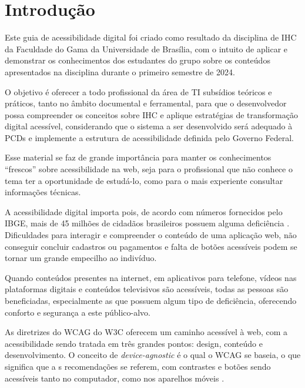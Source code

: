 \documentclass[
  12pt,
  openright,
  twoside,
  a4paper,
  english,
  french,
  spanish,
  brazil
]{abntex2}
\begin{document}
\tableofcontents*
\cleardoublepage

\textual

\chapter{Introdução}

Este guia de acessibilidade digital foi criado como resultado da disciplina de
IHC da Faculdade do Gama da Universidade de Brasília, com o intuito de aplicar e
demonstrar os conhecimentos dos estudantes do grupo sobre os conteúdos
apresentados na disciplina durante o primeiro semestre de 2024.

O objetivo é oferecer a todo profissional da área de TI subsídios teóricos e
práticos, tanto no âmbito documental e ferramental, para que o desenvolvedor
possa compreender os conceitos sobre IHC e aplique estratégias de transformação
digital acessível, considerando que o sistema a ser desenvolvido será adequado à
PCDs e implemente a estrutura de acessibilidade definida pelo Governo Federal.

Esse material se faz de grande importância para manter os conhecimentos
``frescos'' sobre acessibilidade na web, seja para o profissional que não
conhece o tema ter a oportunidade de estudá-lo, como para o mais experiente
consultar informações técnicas.

A acessibilidade digital importa pois, de acordo com números fornecidos pelo
IBGE, mais de 45 milhões de cidadãos brasileiros possuem alguma deficiência
\cite{DAP:Guia-de-Boas-Praticas}. Dificuldades para interagir e compreender o
conteúdo de uma aplicação web, não conseguir concluir cadastros ou pagamentos e
falta de botões acessíveis podem se tornar um grande empecilho ao indivíduo.

Quando conteúdos presentes na internet, em aplicativos para telefone, vídeos nas
plataformas digitais e conteúdos televisivos são acessíveis, todas as pessoas
são beneficiadas, especialmente as que possuem algum tipo de deficiência,
oferecendo conforto e segurança a este público-alvo.

As diretrizes do WCAG do W3C oferecem um caminho acessível à web, com a
acessibilidade sendo tratada em três grandes pontos: design, conteúdo e
desenvolvimento. O conceito de \textit{device-agnostic} é o qual o WCAG se
baseia, o que significa que a s recomendações se referem, com contrastes e
botões sendo acessíveis tanto no computador, como nos aparelhos móveis
\cite{DAP:Guia-de-Boas-Praticas}.
\end{document}

